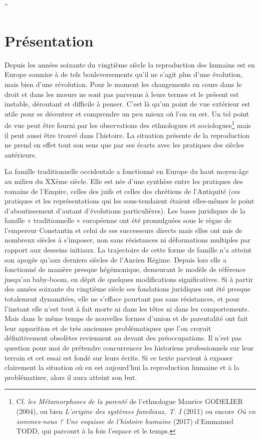 

”\chapter{Présentation}









Depuis les années soixante du vingtième siècle la reproduction des humains est en Europe soumise à de tels bouleversements qu'il ne s'agit plus d'une évolution, mais bien d'une révolution. Pour le moment les changements en cours dans le droit et dans les mœurs ne sont pas parvenus à leurs termes et le présent est instable, déroutant et difficile à penser. C'est là qu'un point de vue extérieur est utile pour se décentrer et comprendre un peu mieux où l'on en est. Un tel point de vue peut être fourni par les observations des ethnologues et sociologues\footnote{Cf. \emph{les Métamorphoses de la parenté} de l'ethnologue Maurice GODELIER (2004), ou bien \emph{L'origine des systèmes familiaux, T. I} (2011) ou encore \emph{Où en sommes-nous ? Une esquisse de l'histoire humaine} (2017) d'Emmanuel TODD, qui parcourt à la fois l'espace et le temps.} mais il peut aussi être trouvé dans l'histoire. La situation présente de la reproduction ne prend en effet tout son sens que par ses écarts avec les pratiques des siècles antérieurs.

La famille traditionnelle occidentale a fonctionné en Europe du haut moyen-âge au milieu du XXème siècle. Elle est née d'une synthèse entre les pratiques des romains de l'Empire, celles des juifs et celles des chrétiens de l'Antiquité (ces pratiques et les représentations qui les sous-tendaient étaient elles-mêmes le point d'aboutissement d'autant d'évolutions particulières). Les bases juridiques de la famille « traditionnelle » européenne ont été promulguées sous le règne de l'empereur Constantin et celui de ses successeurs directs mais elles ont mis de nombreux siècles à s'imposer, non sans résistances ni déformations multiples par rapport aux desseins initiaux. La trajectoire de cette forme de famille n'a atteint son apogée qu'aux derniers siècles de l'Ancien Régime. Depuis lors elle a fonctionné de manière presque hégémonique, demeurant le modèle de référence jusqu'au baby-boom, en dépit de quelques modifications significatives. Si à partir des années soixante du vingtième siècle ses fondations juridiques ont été presque totalement dynamitées, elle ne s'efface pourtant pas sans résistances, et pour l'instant elle n'est tout à fait morte ni dans les têtes ni dans les comportements. Mais dans le même temps de nouvelles formes d'union et de parentalité ont fait leur apparition et de très anciennes problématiques que l'on croyait définitivement obsolètes reviennent au devant des préoccupations. Il n'est pas question pour moi de prétendre concurrencer les historiens professionnels sur leur terrain et cet essai est fondé sur leurs écrits.  Si ce texte parvient à exposer clairement la situation où en est aujourd'hui la reproduction humaine et à la problématiser, alors il aura atteint son but.  
 
